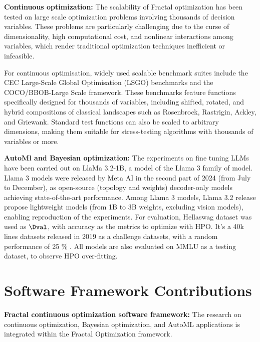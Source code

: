 {\bf Continuous optimization:} The scalability of Fractal optimization has been tested on large scale optimization problems involving thousands of decision variables. These problems are particularly challenging due to the curse of dimensionality, high computational cost, and nonlinear interactions among variables, which render traditional optimization techniques inefficient or infeasible.

For continuous optimisation, widely used scalable benchmark suites include the CEC Large-Scale Global Optimisation (LSGO) benchmarks and the COCO/BBOB-Large Scale framework. These benchmarks feature functions specifically designed for thousands of variables, including shifted, rotated, and hybrid compositions of classical landscapes such as Rosenbrock, Rastrigin, Ackley, and Griewank. Standard test functions can also be scaled to arbitrary dimensions, making them suitable for stress-testing algorithms with thousands of variables or more.

\medskip

{\bf AutoMl and Bayesian optimization:} The experiments on fine tuning LLMs have been carried out on LlaMa 3.2-1B, a model of the Llama 3 family of model. Llama 3 models were released by Meta AI in the second part of 2024 (from July to December), as open-source (topology and weights) decoder-only models achieving state-of-the-art performance. Among Llama 3 models, Llama 3.2 release propose lightweight models (from 1B to 3B weights, excluding vision models), enabling reproduction of the experiments. For evaluation, Hellaswag dataset was used as $\Dval$, with accuracy as the metrics to optimize with HPO. It's a 40k lines datasets released in 2019 as a challenge datasets, with a random performance of 25 \% . All models are also evaluated on MMLU as a testing dataset, to observe HPO over-fitting. 

%   

\section{Software Framework Contributions}
{\bf Fractal continuous optimization software framework:} The research on continuous optimization, Bayesian optimization, and AutoML applications is integrated within the Fractal Optimization framework.

\medskip

